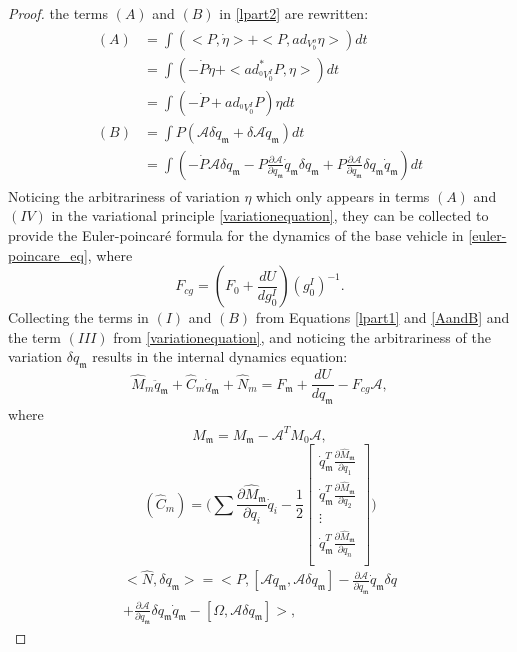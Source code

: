 \documentclass[lettersize,journal]{IEEEtran}
\def \m  {\mathfrak{m}}
\def \A {\mathcal{A}}
\theoremstyle{remark}
\begin{document}
\begin{proof}[Proof]
the terms $(A)$ and $(B)$ in \eqref{lpart2} are rewritten:
\begin{align}
\begin{split}
    (A) &= \int (<P,\dot{\eta}>+ <P,ad_{V^o_b}\eta>)dt\\
        &= \int (-\dot{P}\eta+<ad^*_{^0V^I_0}P,\eta>)dt\\
        &= \int (-\dot{P}+ad_{{}^0V^I_0}P)\eta dt\\
    (B) &= \int P(\A\delta \dot{q}_\mathfrak{m}+\delta \A\dot{q}_\mathfrak{m})dt\\
        &= \int (-\dot{P}\A\delta q_\mathfrak{m}-P\frac{\partial \A}{\partial q_\mathfrak{m}}\dot{q}_\mathfrak{m}\delta q_\mathfrak{m}+P\frac{\partial \A}{\partial q_\mathfrak{m}}\delta q_\mathfrak{m} \dot{q}_\mathfrak{m})dt
        \label{AandB}
\end{split}
\end{align}
Noticing the arbitrariness of variation $\eta$ which only appears in terms $(A)$ and $(IV)$ in the variational principle \eqref{variationequation}, they can be collected to provide the Euler-poincar\'{e} formula for the dynamics of the base vehicle in \eqref{euler-poincare_eq},
where 
\begin{equation}
    F_{cg}=(F_0+\frac{dU}{dg^I_0})(g^I_0)^{-1}.
\end{equation} 
Collecting the terms in $(I)$ and $(B)$ from Equations \ref{lpart1} and \ref{AandB} and the term $(III)$ from \eqref{variationequation}, and noticing the arbitrariness of the variation $\delta q_\mathfrak{m}$ results in the internal dynamics equation:
\begin{equation}
    {\hat{M}_{m}\ddot{q}_\mathfrak{m}+\hat{C}_{m}\dot{q}_\mathfrak{m}+\hat{N}_{m}=F_\mathfrak{m}+\frac{dU}{dq_\m}-F_{cg}\A,}
\end{equation}
where
\begin{equation}
    \hat{M}_\mathfrak{m}=M_\mathfrak{m}-\A^TM_0\A,
\end{equation}
\begin{equation}
    {(\hat{C}_{m})=\bigg(\sum\frac{\partial \hat{M}_\mathfrak{m}}{\partial{q}_i}\dot{q}_i-\frac{1}{2}\begin{bmatrix}\dot{q}_\mathfrak{m}^T\frac{\partial \hat{M}_\mathfrak{m}}{\partial q_1}\\\dot{q}_\mathfrak{m}^T\frac{\partial \hat{M}_\mathfrak{m}}{\partial q_2}\\ \vdots\\\dot{q}_\mathfrak{m}^T\frac{\partial \hat{M}_\mathfrak{m}}{\partial q_n}\\\end{bmatrix}\bigg)}
\end{equation}
\begin{multline}
    <\hat{N},\delta q_\mathfrak{m}>=<P,[\A\dot{q}_\mathfrak{m},\A\delta q_\mathfrak{m}]-\frac{\partial \A}{\partial q_\mathfrak{m}}\dot{q}_\mathfrak{m}\delta q\\
    +\frac{\partial \A}{\partial q_\mathfrak{m}}\delta q_\mathfrak{m} \dot{q}_\mathfrak{m}-[\Omega,\A\delta q_\mathfrak{m}]>,
\end{multline}
\end{proof}
\end{document}
